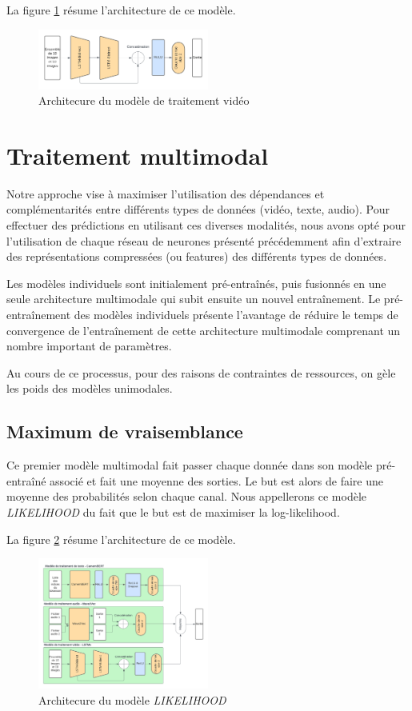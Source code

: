 \documentclass[a4paper]{article}
\begin{document}
La figure \ref{fig: model_video} résume l'architecture de ce modèle.

\begin{figure}[H]
    \centering
    \includegraphics[width=0.5\textwidth]{Traitement_video_SAM.png}
    \caption{Architecure du modèle de traitement vidéo}
    \label{fig: model_video}
\end{figure}

\section{Traitement multimodal}

Notre approche vise à maximiser l'utilisation des dépendances et complémentarités entre différents types de données (vidéo, texte, audio). Pour effectuer des prédictions en utilisant ces diverses modalités, nous avons opté pour l'utilisation de chaque réseau de neurones présenté précédemment afin d'extraire des représentations compressées (ou features) des différents types de données. 

Les modèles individuels sont initialement pré-entraînés, puis fusionnés en une seule architecture multimodale qui subit ensuite un nouvel entraînement. Le pré-entraînement des modèles individuels présente l'avantage de réduire le temps de convergence de l'entraînement de cette architecture multimodale comprenant un nombre important de paramètres.

Au cours de ce processus, pour des raisons de contraintes de ressources, on gèle les poids des modèles unimodales.

\subsection{Maximum de vraisemblance}
Ce premier modèle multimodal fait passer chaque donnée dans son modèle pré-entraîné associé et fait une moyenne des sorties. Le but est alors de faire une moyenne des probabilités selon chaque canal. Nous appellerons ce modèle \textit{LIKELIHOOD} du fait que le but est de maximiser la log-likelihood.

La figure \ref{fig: likelihood} résume l'architecture de ce modèle.

\begin{figure}[H]
    \centering
    \includegraphics[width=0.5\textwidth]{Likelihood.png}
    \caption{Architecure du modèle \textit{LIKELIHOOD}}
    \label{fig: likelihood}
\end{figure}
\end{document}
